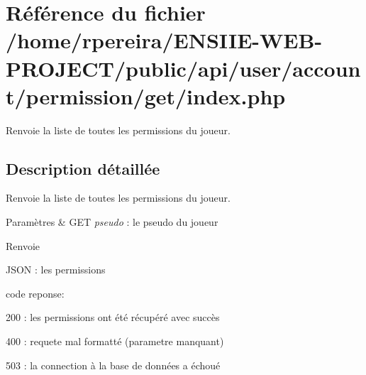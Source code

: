 \hypertarget{user_2account_2permission_2get_2index_8php}{}\section{Référence du fichier /home/rpereira/\+E\+N\+S\+I\+I\+E-\/\+W\+E\+B-\/\+P\+R\+O\+J\+E\+C\+T/public/api/user/account/permission/get/index.php}
\label{user_2account_2permission_2get_2index_8php}


Renvoie la liste de toutes les permissions du joueur.  




\subsection{Description détaillée}
Renvoie la liste de toutes les permissions du joueur. 


\begin{DoxyParams}{Paramètres}
{\em } & G\+ET {\itshape pseudo} \+: le pseudo du joueur \\
\hline
\end{DoxyParams}
\begin{DoxyReturn}{Renvoie}

\begin{DoxyItemize}
\item J\+S\+ON \+: les permissions
\item code reponse\+:
\begin{DoxyItemize}
\item 200 \+: les permissions ont été récupéré avec succès
\item 400 \+: requete mal formatté (parametre manquant)
\item 503 \+: la connection à la base de données a échoué 
\end{DoxyItemize}
\end{DoxyItemize}
\end{DoxyReturn}
